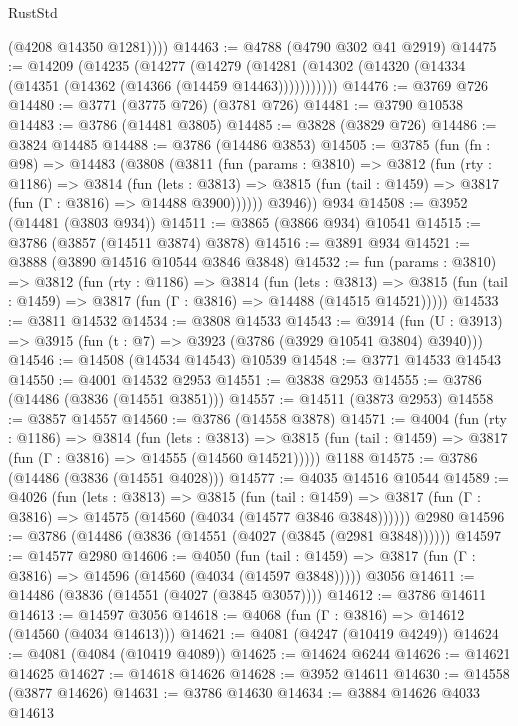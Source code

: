 \begin{lexlean}{RustStd}
\begin{coremodule}
          (@4208 @14350 @1281))))
@14463 := @4788 (@4790 @302 @41 @2919)
@14475 := @14209
    (@14235
      (@14277
        (@14279 (@14281 (@14302 (@14320 (@14334 (@14351 (@14362 (@14366 (@14459 @14463)))))))))))
@14476 := @3769 @726
@14480 := @3771 (@3775 @726) (@3781 @726)
@14481 := @3790 @10538
@14483 := @3786 (@14481 @3805)
@14485 := @3828 (@3829 @726)
@14486 := @3824 @14485
@14488 := @3786 (@14486 @3853)
@14505 := @3785
    (fun (fn : @98) =>
    @14483
      (@3808
        (@3811
          (fun (params : @3810) =>
          @3812
            (fun (rty : @1186) =>
            @3814
              (fun (lets : @3813) =>
              @3815 (fun (tail : @1459) => @3817 (fun (Γ : @3816) => @14488 @3900))))))
        @3946))
    @934
@14508 := @3952 (@14481 (@3803 @934))
@14511 := @3865 (@3866 @934) @10541
@14515 := @3786 (@3857 (@14511 @3874) @3878)
@14516 := @3891 @934
@14521 := @3888 (@3890 @14516 @10544 @3846 @3848)
@14532 := fun (params : @3810) =>
  @3812
    (fun (rty : @1186) =>
    @3814
      (fun (lets : @3813) =>
      @3815 (fun (tail : @1459) => @3817 (fun (Γ : @3816) => @14488 (@14515 @14521)))))
@14533 := @3811 @14532
@14534 := @3808 @14533
@14543 := @3914
    (fun (U : @3913) => @3915 (fun (t : @7) => @3923 (@3786 (@3929 @10541 @3804) @3940)))
@14546 := @14508 (@14534 @14543) @10539
@14548 := @3771 @14533 @14543
@14550 := @4001 @14532 @2953
@14551 := @3838 @2953
@14555 := @3786 (@14486 (@3836 (@14551 @3851)))
@14557 := @14511 (@3873 @2953)
@14558 := @3857 @14557
@14560 := @3786 (@14558 @3878)
@14571 := @4004
    (fun (rty : @1186) =>
    @3814
      (fun (lets : @3813) =>
      @3815 (fun (tail : @1459) => @3817 (fun (Γ : @3816) => @14555 (@14560 @14521)))))
    @1188
@14575 := @3786 (@14486 (@3836 (@14551 @4028)))
@14577 := @4035 @14516 @10544
@14589 := @4026
    (fun (lets : @3813) =>
    @3815
      (fun (tail : @1459) =>
      @3817 (fun (Γ : @3816) => @14575 (@14560 (@4034 (@14577 @3846 @3848))))))
    @2980
@14596 := @3786 (@14486 (@3836 (@14551 (@4027 (@3845 (@2981 @3848))))))
@14597 := @14577 @2980
@14606 := @4050
    (fun (tail : @1459) => @3817 (fun (Γ : @3816) => @14596 (@14560 (@4034 (@14597 @3848)))))
    @3056
@14611 := @14486 (@3836 (@14551 (@4027 (@3845 @3057))))
@14612 := @3786 @14611
@14613 := @14597 @3056
@14618 := @4068 (fun (Γ : @3816) => @14612 (@14560 (@4034 @14613)))
@14621 := @4081 (@4247 (@10419 @4249))
@14624 := @4081 (@4084 (@10419 @4089))
@14625 := @14624 @6244
@14626 := @14621 @14625
@14627 := @14618 @14626
@14628 := @3952 @14611
@14630 := @14558 (@3877 @14626)
@14631 := @3786 @14630
@14634 := @3884 @14626 @4033 @14613

\end{coremodule}
\end{lexlean}
